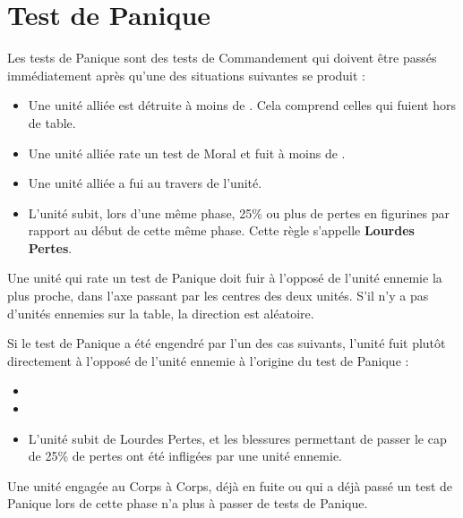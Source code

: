 \section{Test de Panique}

Les tests de Panique sont des tests de Commandement qui doivent être passés immédiatement après qu'une des situations suivantes se produit :
\begin{itemize}[label={-}]
\item Une unité alliée est détruite à moins de . Cela comprend celles qui fuient hors de table.
\item Une unité alliée rate un test de Moral et fuit à moins de .
\item Une unité alliée a fui au travers de l'unité.
\item L'unité subit, lors d'une même phase, 25\% ou plus de pertes en figurines par rapport au début de cette même phase. Cette règle s'appelle \textbf{Lourdes Pertes}.
\end{itemize}

Une unité qui rate un test de Panique doit fuir à l'opposé de l'unité ennemie la plus proche, dans l'axe passant par les centres des deux unités. S'il n'y a pas d'unités ennemies sur la table, la direction est aléatoire.

Si le test de Panique a été engendré par l'un des cas suivants, l'unité fuit plutôt directement à l'opposé de l'unité ennemie à l'origine du test de Panique :
\begin{itemize}[label={-}]
\item {}
\item {}
\item L'unité subit de Lourdes Pertes, et les blessures permettant de passer le cap de 25\% de pertes ont été infligées par une unité ennemie.
\end{itemize}

Une unité engagée au Corps à Corps, déjà en fuite ou qui a déjà passé un test de Panique lors de cette phase n'a plus à passer de tests de Panique.
